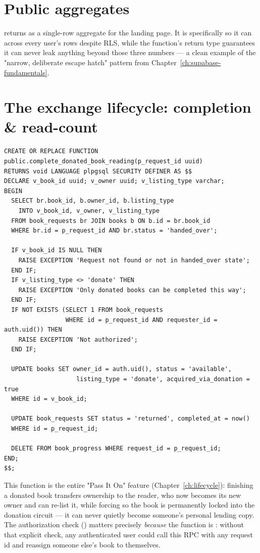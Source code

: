 \section{Public aggregates}

 returns  as a single-row aggregate for the landing page. It is  specifically so it can  across every user's rows despite RLS, while the function's return type guarantees it can never leak anything beyond those three numbers — a clean example of the "narrow, deliberate escape hatch" pattern from Chapter~\ref{ch:supabase-fundamentals}.

\section{The exchange lifecycle: completion \& read-count}

\begin{lstlisting}[style=olkcodesql, caption={complete\_donated\_book\_reading — ownership transfer with an authorization check inline}]
CREATE OR REPLACE FUNCTION public.complete_donated_book_reading(p_request_id uuid)
RETURNS void LANGUAGE plpgsql SECURITY DEFINER AS $$
DECLARE v_book_id uuid; v_owner uuid; v_listing_type varchar;
BEGIN
  SELECT br.book_id, b.owner_id, b.listing_type
    INTO v_book_id, v_owner, v_listing_type
  FROM book_requests br JOIN books b ON b.id = br.book_id
  WHERE br.id = p_request_id AND br.status = 'handed_over';

  IF v_book_id IS NULL THEN
    RAISE EXCEPTION 'Request not found or not in handed_over state';
  END IF;
  IF v_listing_type <> 'donate' THEN
    RAISE EXCEPTION 'Only donated books can be completed this way';
  END IF;
  IF NOT EXISTS (SELECT 1 FROM book_requests
                 WHERE id = p_request_id AND requester_id = auth.uid()) THEN
    RAISE EXCEPTION 'Not authorized';
  END IF;

  UPDATE books SET owner_id = auth.uid(), status = 'available',
                    listing_type = 'donate', acquired_via_donation = true
  WHERE id = v_book_id;

  UPDATE book_requests SET status = 'returned', completed_at = now()
  WHERE id = p_request_id;

  DELETE FROM book_progress WHERE request_id = p_request_id;
END;
$$;
\end{lstlisting}

This function is the entire "Pass It On" feature (Chapter~\ref{ch:lifecycle}): finishing a donated book transfers ownership to the reader, who now becomes its new owner and can re-list it, while forcing  so the book is permanently locked into the donation circuit — it can never quietly become someone's personal lending copy. The authorization check () matters precisely \emph{because} the function is : without that explicit check, any authenticated user could call this RPC with any request id and reassign someone else's book to themselves.

